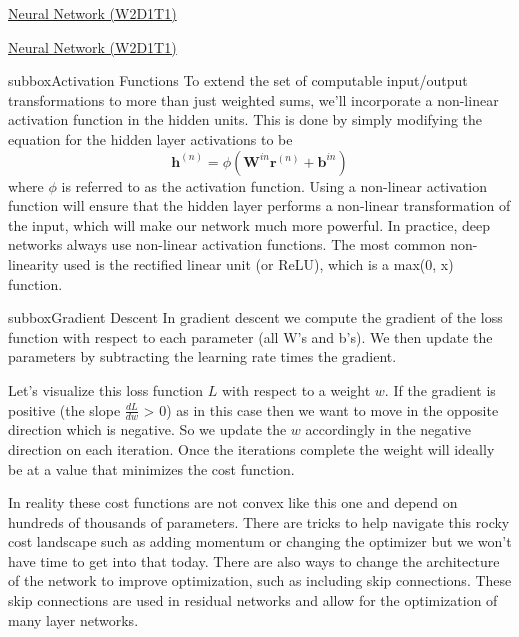 \begin{textbox}{\href{https://compneuro.neuromatch.io/tutorials/W2D1_DeepLearning/student/W2D1_Tutorial1.html}{Neural Network (W2D1T1)} }
\end{textbox}
\begin{textbox}{\href{https://compneuro.neuromatch.io/tutorials/W2D1_DeepLearning/student/W2D1_Tutorial1.html}{Neural Network (W2D1T1)} }
\begin{subbox}{subbox}{Activation Functions}
\scriptsize
To extend the set of computable input/output transformations to more than just weighted sums, we'll incorporate a non-linear activation function in the hidden units. This is done by simply modifying the equation for the hidden layer activations to be
\begin{equation}
    \mathbf{h}^{(n)} = \phi(\mathbf{W}^{in} \mathbf{r}^{(n)} + \mathbf{b}^{in})
\end{equation}
where $\phi$ is referred to as the activation function. Using a non-linear activation function will ensure that the hidden layer performs a non-linear transformation of the input, which will make our network much more powerful. In practice, deep networks always use non-linear activation functions.
The most common non-linearity used is the rectified linear unit (or ReLU), which is a max(0, x) function.

\end{subbox}
\begin{subbox}{subbox}{Gradient Descent}
\scriptsize
In gradient descent we compute the gradient of the loss function with respect to each parameter (all W’s and b’s). We then update the parameters by subtracting the learning rate times the gradient. 

Let’s visualize this loss function $L$ with respect to a weight $w$. If the gradient is positive (the slope $\frac{dL}{dw}$ > 0) as in this case then we want to move in the opposite direction which is negative. So we update the $w$ accordingly in the negative direction on each iteration. Once the iterations complete the weight will ideally be at a value that minimizes the cost function.

In reality these cost functions are not convex like this one and depend on hundreds of thousands of parameters. There are tricks to help navigate this rocky cost landscape such as adding momentum or changing the optimizer but we won’t have time to get into that today. There are also ways to change the architecture of the network to improve optimization, such as including skip connections. These skip connections are used in residual networks and allow for the optimization of many layer networks.


\end{subbox}
\end{textbox}
